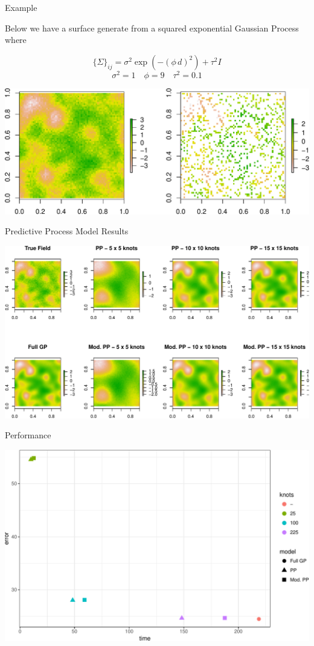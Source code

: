 \documentclass[11pt,ignorenonframetext,]{beamer}
\begin{document}
\begin{frame}{Example}

Below we have a surface generate from a squared exponential Gaussian
Process where

\[ \{\Sigma\}_{ij} = \sigma^2 \exp\left(-(\phi\,d)^2\right) + \tau^2 I \]
\[ \sigma^2 = 1 \quad \phi=9 \quad \tau^2 = 0.1 \]

\includegraphics{Lec22_files/figure-beamer/unnamed-chunk-10-1.pdf}

\end{frame}

\begin{frame}{Predictive Process Model Results}

\includegraphics{Lec22_files/figure-beamer/unnamed-chunk-13-1.pdf}

\end{frame}

\begin{frame}{Performance}

\includegraphics{Lec22_files/figure-beamer/unnamed-chunk-14-1.pdf}

\end{frame}
\end{document}

